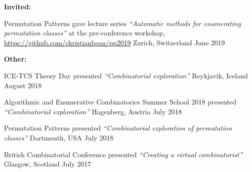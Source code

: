 


\begin{cvhonors}
\begin{flushleft}
  \textbf{Invited:}
\end{flushleft}

\cvhonor
  {Permutation Patterns} %
  {gave lecture series \textit{``Automatic methods for enumerating permutation classes''} at the pre-conference workshop, \url{https://github.com/christianbean/pp2019}} %
  {Zurich, Switzerland} %
  {June 2019} %


\begin{flushleft}
  \textbf{Other:}
\end{flushleft}

\cvhonor
  {ICE-TCS Theory Day} %
  {presented \textit{``Combinatorial exploration''}} %
  {Reykjavik, Iceland} %
  {August 2018} %



\cvhonor
  {Algorithmic and Enumerative Combinatorics Summer School 2018} %
  {presented \textit{``Combinatorial exploration''}} %
  {Hagenberg, Austria} %
  {July 2018} %


\cvhonor
  {Permutation Patterns} %
  {presented \textit{``Combinatorial exploration of permutation classes''}} %
  {Dartmouth, USA} %
  {July 2018} %



\cvhonor
  {British Combinatorial Conference} %
  {presented \textit{``Creating a virtual combinatorist''}} %
  {Glasgow, Scotland} %
  {July 2017} %


\end{cvhonors}
